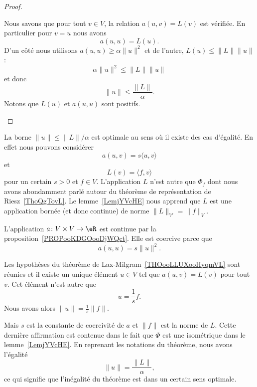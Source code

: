 \begin{proof}
\begin{subproof}
		Nous savons que pour tout \( v\in V\), la relation \( a(u,v)=L(v)\) est vérifiée. En particulier pour \( v=u\) nous avons
		\begin{equation}
			a(u,u)=L(u).
		\end{equation}
		D'un côté nous utilisons \( a(u,u)\geq \alpha\| u \|^2\) et de l'autre, \( L(u)\leq \| L \|\| u \|\) :
		\begin{equation}
			\alpha\| u \|^2\leq \| L \|\| u \|
		\end{equation}
		et donc
		\begin{equation}
			\| u \|\leq \frac{ \| L \| }{ \alpha }.
		\end{equation}
		Notons que \( L(u)\) et \( a(u,u)\) sont positifs.
	\end{subproof}
\end{proof}

\begin{example}      \label{EXooTTBDooUNhBOc}
	La borne \( \| u \|\leq \| L \|/\alpha\) est optimale au sens où il existe des cas d'égalité. En effet nous pouvons considérer
	\begin{equation}
		a(u,v)=s\langle u, v\rangle
	\end{equation}
	et
	\begin{equation}
		L(v)=\langle f, v\rangle
	\end{equation}
	pour un certain \( s>0\) et \( f\in V\). L'application \( L\) n'est autre que \( \Phi_f\) dont nous avons abondamment parlé autour du théorème de représentation de Riesz~\ref{ThoQgTovL}. Le lemme~\ref{LemjYVcHE} nous apprend que \( L\) est une application bornée (et donc continue) de norme \( \| L \|_{V'}=\| f \|_V\).

	L'application \( a\colon V\times V\to \eR\) est continue par la proposition~\ref{PROPooKDGOooDjWQct}. Elle est coercive parce que
	\begin{equation}
		a(u,u)=s\| u \|^2.
	\end{equation}

	Les hypothèses du théorème de Lax-Milgram~\ref{THOooLLUXooHyqmVL} sont réunies et il existe un unique élément \(u\in V\) tel que \( a(u,v)=L(v)\) pour tout \( v\). Cet élément n'est autre que
	\begin{equation}
		u=\frac{1}{ s }f.
	\end{equation}
	Nous avons alors \( \| u \|=\frac{1}{ s }\| f \|\).

	Mais \( s\) est la constante de coercivité de \( a\) et \( \| f \|\) est la norme de \( L\). Cette dernière affirmation est contenue dans le fait que \( \Phi\) est une isométrique dans le lemme~\ref{LemjYVcHE}. En reprenant les notations du théorème, nous avons l'égalité
	\begin{equation}
		\| u \|=\frac{ \| L \| }{ \alpha },
	\end{equation}
	ce qui signifie que l'inégalité du théorème est dans un certain sens optimale.
\end{example}

